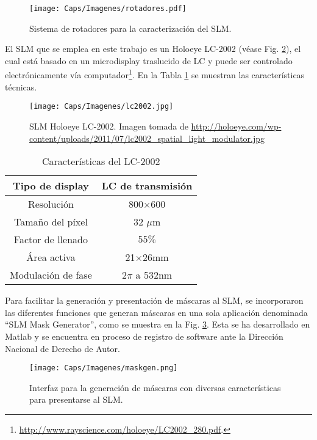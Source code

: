 \begin{figure}[!ht]
  \centering
    \texttt{[image: Caps/Imagenes/rotadores.pdf]}
  \caption{Sistema de rotadores para la caracterización del SLM.}
  \label{fig:rotadores}
\end{figure}

El SLM que se emplea en este trabajo es un Holoeye LC-2002 (véase Fig. \ref{fig:lc2002}), el cual está basado en un microdisplay traslucido de LC y puede ser controlado electrónicamente vía computador\footnote{\url{http://www.rayscience.com/holoeye/LC2002_280.pdf}. }. En la Tabla \ref{tab:lc2002} se muestran las características técnicas.

\begin{figure}[!ht]
  \centering
    \texttt{[image: Caps/Imagenes/lc2002.jpg]}
  \caption[SLM HOLOEYE LC-2002.]{SLM Holoeye LC-2002. Imagen tomada de \small \url{http://holoeye.com/wp-content/uploads/2011/07/lc2002_spatial_light_modulator.jpg}}
  \label{fig:lc2002}		
\end{figure}



\begin{center}
\begin{table}
\centering
\begin{tabular}{|c|c|}
\hline 
Tipo de display & LC de transmisión \\ 
\hline 
Resolución & 800$\times$600 \\ 
\hline 
Tamaño del píxel & 32 $\mu$m \\ 
\hline 
Factor de llenado & $55\%$ \\ 
\hline 
Área activa & 21$\times$26mm \\ 
\hline 
Modulación de fase & $2\pi$ a 532nm \\ 
\hline 
\end{tabular} 
\caption{Características del LC-2002}
\label{tab:lc2002}
\end{table}
\end{center}

Para facilitar la generación y presentación de máscaras al SLM, se incorporaron las diferentes funciones que generan máscaras en una sola aplicación denominada ``SLM Mask Generator'', como se muestra en la Fig. \ref{fig:maskgen}. Esta se ha desarrollado en Matlab y se encuentra en proceso de registro de software ante la Dirección Nacional de Derecho de Autor.\\

\begin{figure}[!ht]
  \centering
	    \texttt{[image: Caps/Imagenes/maskgen.png]}
	\caption[Interfaz para la generación de máscaras.]{Interfaz para la generación de máscaras con diversas características para presentarse al SLM.}
	\label{fig:maskgen}
\end{figure}

